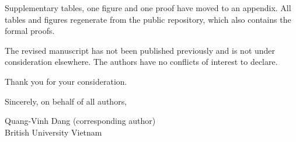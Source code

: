 \documentclass[11pt]{article}
\begin{document}
Supplementary tables, one figure and one proof have moved to an
appendix. All tables and figures regenerate from the public repository,
which also contains the formal proofs.

The revised manuscript has not been published previously and is not
under consideration elsewhere. The authors have no conflicts of interest
to declare.

Thank you for your consideration.

\vspace{14pt}
\noindent Sincerely, on behalf of all authors,

\vspace{6pt}
\noindent Quang-Vinh Dang (corresponding author)\\
British University Vietnam
\end{document}
